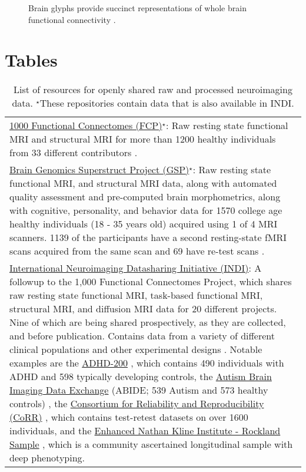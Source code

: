 \documentclass{bmcart}
\begin{document}
\begin{backmatter}
\begin{figure}[h!]
  \caption{\label{fig:neurophenotypes} Brain glyphs provide succinct representations of whole brain functional connectivity \cite{Bottger2014}. }
      \end{figure}
	  
\section*{Tables}

\renewcommand{\arraystretch}{1.5}

\begin{table}[h!]
\caption{List of resources for openly shared raw and processed neuroimaging data. $^{\star}$These repositories contain data that is also available in INDI.}
\label{Table1}
      \begin{tabular}{L{5.5in}}
        \hline
        \href{http://fcon_1000.projects.nitrc.org}{1000 Functional Connectomes (FCP)}$^{\star}$: Raw resting state functional MRI and structural MRI for more than 1200 healthy individuals from 33 different contributors \cite{Biswal2010}. \\ 
		\href{https://thedata.harvard.edu/dvn/dv/GSP}{Brain Genomics Superstruct Project (GSP)}$^{\star}$: Raw resting state functional MRI, and structural MRI data, along with automated quality assessment and pre-computed brain morphometrics, along with cognitive, personality, and behavior data for 1570 college age healthy individuals (18 - 35 years old) acquired using 1 of 4 MRI scanners. 1139 of the participants have a second resting-state fMRI scans acquired from the same scan and 69 have re-test scans \cite{BucknerGSP2014}.\\
		\href{http://fcon_1000.projects.nitrc.org}{International Neuroimaging Datasharing Initiative (INDI)}: A followup to the 1,000 Functional Connectomes Project, which shares raw resting state functional MRI, task-based functional MRI, structural MRI, and diffusion MRI data for 20 different projects. Nine of which are being shared prospectively, as they are collected, and before publication. Contains data from a variety of different clinical populations and other experimental designs \cite{Mennes2013}. Notable examples are the \href{http://fcon_1000.projects.nitrc.org/indi/adhd200}{ADHD-200} \cite{Milham2012adhd}, which contains 490 individuals with ADHD and 598 typically developing controls, the \href{http://fcon_1000.projects.nitrc.org/indi/abide}{Autism Brain Imaging Data Exchange} (ABIDE; 539 Autism and 573 healthy controls) \cite{DiMartino2014}, the \href{http://fcon_1000.projects.nitrc.org/indi/CoRR/html/}{Consortium for Reliability and Reproducibility (CoRR)} \cite{Zuo2014}, which contains test-retest datasets on over 1600 individuals, and the \href{http://fcon_1000.projects.nitrc.org/indi/enhanced/}{Enhanced Nathan Kline Institute - Rockland Sample} \cite{Nooner2012}, which is a community ascertained longitudinal sample with deep phenotyping. \\

\end{tabular}
\end{table}
\end{backmatter}
\end{document}
